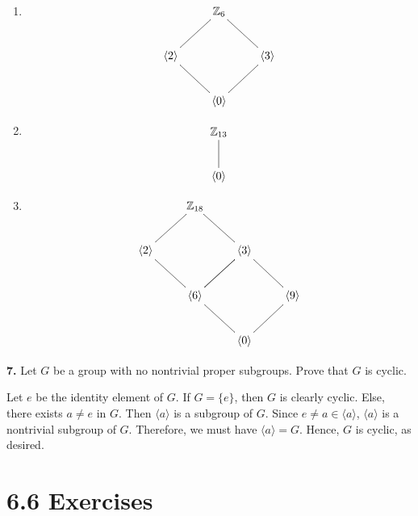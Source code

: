 \documentclass[10pt,]{book}
\theoremstyle{plain}
\theoremstyle{definition}
\theoremstyle{definition}
\theoremstyle{definition}
\theoremstyle{definition}
\numberwithin{equation}{section}
\def\Z{\mathbb{Z}}
\begin{document}
\par\smallskip
\leavevmode%
\begin{enumerate}[label=(\alph*)]
\item\hypertarget{li-318}{}
    {
\[\xymatrix{&\Z_6&\\ \langle 2\rangle \ar@{-}[ur]&&\langle 3\rangle\ar@{-}[ul]\\&\langle 0\rangle \ar@{-}[ul]\ar@{-}[ur]&}\]
}


%
\item\hypertarget{li-319}{}
    {
\[\xymatrix{\Z_{13}\ar@{-}[d]\\ \langle0\rangle}\]
}

%
\item\hypertarget{li-320}{}
    {
\[\xymatrix{&\Z_{18}&&\\ \langle 2\rangle\ar@{-}[ur]\ar@{-}[dr]&&\langle 3\rangle\ar@{-}[ul]\ar@{-}[dl]&\\
&\langle 6 \rangle \ar@{-}[dr]\ar@{-}[ur]&& \langle 9 \rangle \ar@{-}[dl]\ar@{-}[ul]\\&& \langle 0 \rangle &}\]
}

%
\end{enumerate}
\par\smallskip
\noindent\textbf{7.}\quad{}
        Let \(G\) be a group with no nontrivial proper subgroups. Prove that \(G\) is cyclic.
\par\smallskip

      Let \(e\) be the identity
      element of \(G\). If \(G=\{e\}\), then \(G\) is clearly
      cyclic. Else, there exists \(a\neq e\) in \(G\). Then
      \(\langle a\rangle\) is a subgroup of \(G\). Since \(e\neq a\in
      \langle a\rangle\), \(\langle a\rangle\) is a nontrivial subgroup of \(G\). Therefore, we must have
      \(\langle a\rangle =G\). Hence, \(G\) is cyclic, as desired.
\par\smallskip
\section*{6.6 Exercises}
\end{document}

